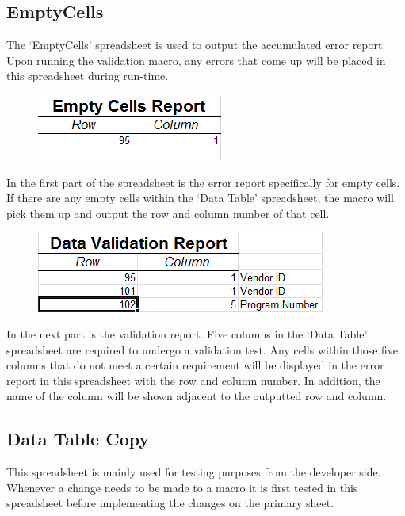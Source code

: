 \documentclass[12pt,a4paper]{report}
\begin{document}
        \subsection{EmptyCells}
        The ‘EmptyCells’ spreadsheet is used to output the accumulated error report. Upon running the validation macro, any errors that come up will be placed in this spreadsheet during run-time.
        \begin{figure}[h]
        \centering
        \includegraphics{MasterEmptyCellReport}
        \end{figure}
        \newline
        In the first part of the spreadsheet is the error report specifically for empty cells. If there are any empty cells within the `Data Table' spreadsheet, the macro will pick them up and output the row and column number of that cell.
        \begin{figure}[h]
        \centering
        \includegraphics{MasterValidationReport}
        \end{figure}
        \newline
        In the next part is the validation report. Five columns in the `Data Table' spreadsheet are required to undergo a validation test. Any cells within those five columns that do not meet a certain requirement will be displayed in the error report in this spreadsheet with the row and column number. In addition, the name of the column will be shown adjacent to the outputted row and column.
        \subsection{Data Table Copy}
        This spreadsheet is mainly used for testing purposes from the developer side. Whenever a change needs to be made to a macro it is first tested in this spreadsheet before implementing the changes on the primary sheet.
\end{document}

